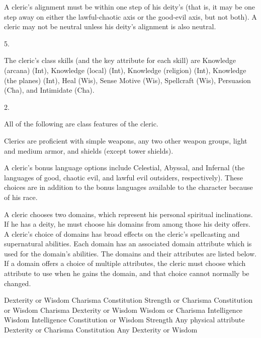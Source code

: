  A cleric's alignment must be within one step of his deity's (that is, it may be one step away on either the lawful-chaotic axis or the good-evil axis, but not both). A cleric may not be neutral unless his deity's alignment is also neutral.

 5.

The cleric's class skills (and the key attribute for each skill) are Knowledge (arcana) (Int), Knowledge (local) (Int), Knowledge (religion) (Int), Knowledge (the planes) (Int), Heal (Wis), Sense Motive (Wis), Spellcraft (Wis), Persuasion (Cha), and Intimidate (Cha).

 2.

All of the following are class features of the cleric.

   Clerics are proficient with simple weapons, any two other weapon groups, light and medium armor, and shields (except tower shields).

 A cleric's bonus language options include Celestial, Abyssal, and Infernal (the languages of good, chaotic evil, and lawful evil outsiders, respectively). These choices are in addition to the bonus languages available to the character because of his race.

 A cleric chooses two domains, which represent his personal spiritual inclinations. If he has a deity, he must choose his domains from among those his deity offers. A cleric's choice of domains has broad effects on the cleric's spellcasting and supernatural abilities. Each domain has an associated domain attribute which is used for the domain's abilities. The domains and their attributes are listed below. If a domain offers a choice of multiple attributes, the cleric must choose which attribute to use when he gains the domain, and that choice cannot normally be changed.

 Dexterity or Wisdom
 Charisma
 Constitution
 Strength or Charisma
 Constitution or Wisdom
 Charisma
 Dexterity or Wisdom
 Wisdom or Charisma
 Intelligence
 Wisdom
 Intelligence
 Constitution or Wisdom
 Strength
 Any physical attribute
 Dexterity or Charisma
 Constitution
 Any 
 Dexterity or Wisdom

